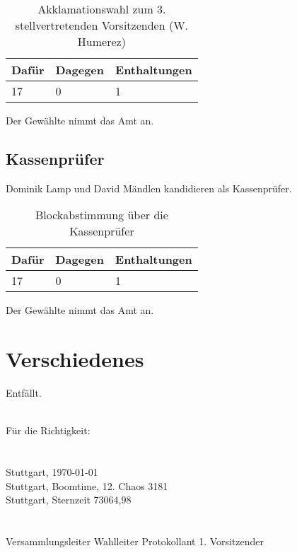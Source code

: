 \documentclass[a4paper]{scrartcl}
\begin{document}
\begin{table}[h]
	\begin{tabularx}{\textwidth}{XXX}
		Dafür & Dagegen & Enthaltungen\\
		\toprule
		17 & 0 & 1\\
	\end{tabularx}
	\caption{Akklamationswahl zum 3. stellvertretenden Vorsitzenden (W. Humerez)}
\end{table}
Der Gewählte nimmt das Amt an.

\subsection{Kassenprüfer}
Dominik Lamp und David Mändlen kandidieren als Kassenprüfer.

\begin{table}[h]
	\begin{tabularx}{\textwidth}{XXX}
		Dafür & Dagegen & Enthaltungen\\
		\toprule
		17 & 0 & 1\\
	\end{tabularx}
	\caption{Blockabstimmung über die Kassenprüfer}
\end{table}
Der Gewählte nimmt das Amt an.

\clearpage

\section{Verschiedenes }
Entfällt.

\vfill
\mbox{}\\
Für die Richtigkeit:\\
\\
\\
Stuttgart, \today\\
Stuttgart, Boomtime, 12. Chaos 3181\\
Stuttgart, Sternzeit 73064,98\\
\\
\\
\hfill Versammlungsleiter \hfill Wahlleiter \hfill Protokollant \hfill 1. Vorsitzender \hfill
\end{document}
